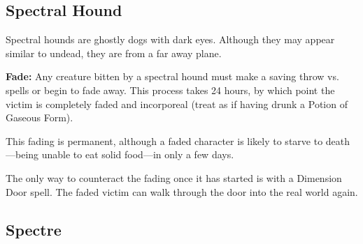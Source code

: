 \begin{multicols*}{2}
\subsection{Spectral Hound}

Spectral hounds are ghostly dogs with dark eyes. Although they may appear similar to undead, they are from a far away plane.

\textbf{Fade:} Any creature bitten by a spectral hound must make a saving throw vs. spells or begin to fade away. This process takes 24 hours, by which point the victim is completely faded and incorporeal (treat as if having drunk a Potion of Gaseous Form).

This fading is permanent, although a faded character is likely to starve to death—being unable to eat solid food—in only a few days.

The only way to counteract the fading once it has started is with a Dimension Door spell. The faded victim can walk through the door into the real world again.

\subsection{Spectre}
\end{multicols*}
